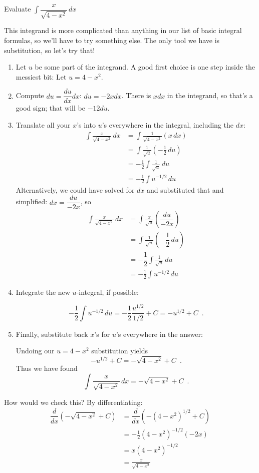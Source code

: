 \begin{example}
Evaluate $\int \dfrac{x}{\sqrt{4-x^2}}\,dx$

\begin{solution}
  This integrand is more complicated than anything in our list of basic integral formulas, so we'll have to try something else. The only tool we have is substitution, so let's try that!
  \begin{enumerate}
    \item Let $u$ be some part of the integrand. A good first choice is one step inside the messiest bit:
    Let $u=4-x^2$.

    \item Compute $du = \dfrac{du}{dx}dx$:
    $du=-2xdx$. There is $xdx$ in the integrand, so that’s a good sign; that will be $-12du$.

    \item Translate all your $x$'s into $u$'s everywhere in the integral, including the $dx$:
    \begin{align*}
    \int \frac{x}{\sqrt{4-x^2}}\,dx &= \int \frac{1}{\sqrt{4-x^2}}(x\,dx)\\
      &= \int \frac{1}{\sqrt{u}}\left(-\frac{1}{2}\,du\right) \\
      &= -\frac{1}{2}\int \frac{1}{\sqrt{u}}\,du\\
      &= -\frac{1}{2}\int u^{-1/2}\,du
    \end{align*}
    Alternatively, we could have solved for $dx$ and substituted that and simplified: $dx=\dfrac{du}{-2x}$, so
    \begin{align*}
    \int \frac{x}{\sqrt{4-x^2}}\,dx &= \int \frac{x}{\sqrt{u}}\left(\dfrac{du}{-2x}\right)\\
      &= \int \frac{1}{\sqrt{u}}\left(-\dfrac{1}{2}\,du\right) \\
      &= -\dfrac{1}{2}\int \frac{1}{\sqrt{u}}\,du\\
      &= -\frac{1}{2}\int u^{-1/2}\,du
    \end{align*}
  \item Integrate the new $u$-integral, if possible:

  $$-\frac{1}{2}\int u^{-1/2}\,du = -\frac{1}{2}\frac{u^{1/2}}{1/2} + C = -u^{1/2}+C \enspace .$$
  \item Finally, substitute back $x$'s for $u$'s everywhere in the answer:

  Undoing our $u=4-x^2$ substitution yields
  $$-u^{1/2}+C = -\sqrt{4-x^2}+C \enspace .$$
  Thus we have found
  $$\int \frac{x}{\sqrt{4-x^2}}\,dx = -\sqrt{4-x^2}+C \enspace .$$
\end{enumerate}

How would we check this? By differentiating:
\begin{align*}
\dfrac{d}{dx}\left(-\sqrt{4-x^2}+C \right) &= \dfrac{d}{dx}(-(4-x^2)^{1/2}+C)\\
  &= -\frac{1}{2}(4-x^2)^{-1/2}(-2x) \\
  &= x(4-x^2)^{-1/2}\\
  &= \frac{x}{\sqrt{4-x^2}}
\end{align*}
\end{solution}\end{example}

